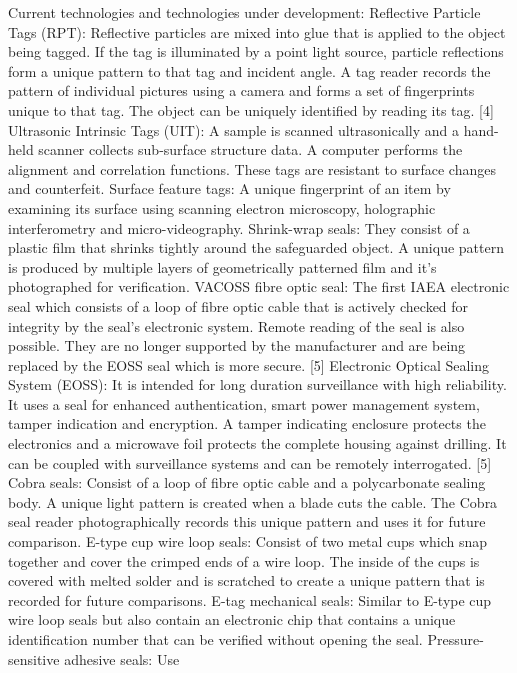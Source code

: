 \documentclass[twocolumn,a4paper]{article}
\begin{document}
Current technologies and technologies under development:
\citep{zarimpas2003} Reflective Particle Tags (RPT): Reflective
particles are mixed into glue that is applied to the object being
tagged. If the tag is illuminated by a point light source, particle
reflections form a unique pattern to that tag and incident angle. A
tag reader records the pattern of individual pictures using a camera
and forms a set of fingerprints unique to that tag. The object can be
uniquely identified by reading its tag. [4] Ultrasonic Intrinsic Tags
(UIT): A sample is scanned ultrasonically and a hand-held scanner
collects sub-surface structure data. A computer performs the alignment
and correlation functions. These tags are resistant to surface changes
and counterfeit.  Surface feature tags: A unique fingerprint of an
item by examining its surface using scanning electron microscopy,
holographic interferometry and micro-videography.  Shrink-wrap seals:
They consist of a plastic film that shrinks tightly around the
safeguarded object. A unique pattern is produced by multiple layers of
geometrically patterned film and it’s photographed for verification.
VACOSS fibre optic seal: The first IAEA electronic seal which consists
of a loop of fibre optic cable that is actively checked for integrity
by the seal’s electronic system. Remote reading of the seal is also
possible. They are no longer supported by the manufacturer and are
being replaced by the EOSS seal which is more secure. [5] Electronic
Optical Sealing System (EOSS): It is intended for long duration
surveillance with high reliability. It uses a seal for enhanced
authentication, smart power management system, tamper indication and
encryption. A tamper indicating enclosure protects the electronics and
a microwave foil protects the complete housing against drilling. It
can be coupled with surveillance systems and can be remotely
interrogated. [5] Cobra seals: Consist of a loop of fibre optic cable
and a polycarbonate sealing body. A unique light pattern is created
when a blade cuts the cable. The Cobra seal reader photographically
records this unique pattern and uses it for future comparison.  E-type
cup wire loop seals: Consist of two metal cups which snap together and
cover the crimped ends of a wire loop. The inside of the cups is
covered with melted solder and is scratched to create a unique pattern
that is recorded for future comparisons.  E-tag mechanical seals:
Similar to E-type cup wire loop seals but also contain an electronic
chip that contains a unique identification number that can be verified
without opening the seal.  Pressure-sensitive adhesive seals: Use
\end{document}
